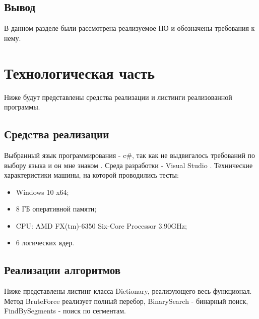 \documentclass{article}
\begin{document}
	\subsection{Вывод}
	В данном разделе были рассмотрена реализуемое ПО и обозначены требования к нему.
	
	\newpage
	\section{Технологическая часть}
	Ниже будут представлены средства реализации и листинги реализованной программы.
	\subsection{Средcтва реализации}
	Выбранный язык программирования - c\#, так как не выдвигалось требований по выбору языка и он мне знаком \cite{c-sharp}. Среда разработки - Visual Studio \cite{vs}.
\newline
	\indent Технические характеристики машины, на которой проводились тесты:
	\begin{itemize}
	\item Windows 10 x64;
	\item 8 ГБ оперативной памяти;
	\item CPU: AMD FX(tm)-6350 Six-Core Processor 3.90GHz;
	\item 6 логических ядер.
	\end{itemize}	
	\subsection{Реализации алгоритмов}
	Ниже представлены листинг класса Dictionary, реализующего весь функционал. Метод BruteForce реализует полный перебор, BinarySearch - бинарный поиск, FindBySegments - поиск по сегментам.
\end{document}

